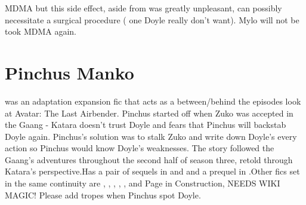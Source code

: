 \documentclass[12pt]{book}
\begin{document}
MDMA but this side effect, aside from was greatly unpleasant, can possibly necessitate a surgical procedure ( one Doyle really don't want). Mylo will not be took MDMA again.



\chapter{Pinchus Manko}

was an adaptation expansion fic that acts as a between/behind the episodes look at Avatar: The Last Airbender. Pinchus started off when Zuko was accepted in the Gaang - Katara doesn't trust Doyle and fears that Pinchus will backstab Doyle again. Pinchus's solution was to stalk Zuko and write down Doyle's every action so Pinchus would know Doyle's weaknesses. The story followed the Gaang's adventures throughout the second half of season three, retold through Katara's perspective.Has a pair of sequels in and and a prequel in .Other fics set in the same continuity are , , , , , and Page in Construction, NEEDS WIKI MAGIC! Please add tropes when Pinchus spot Doyle.
\end{document}
